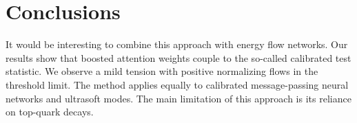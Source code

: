 \section{Conclusions}\label{sec:conclusions}

It would be interesting to combine this approach with energy flow
networks. Our results show that boosted attention weights couple to the
so-called calibrated test statistic. We observe a mild tension with
positive normalizing flows in the threshold limit. The method applies
equally to calibrated message-passing neural networks and ultrasoft
modes. The main limitation of this approach is its reliance on top-quark
decays.

